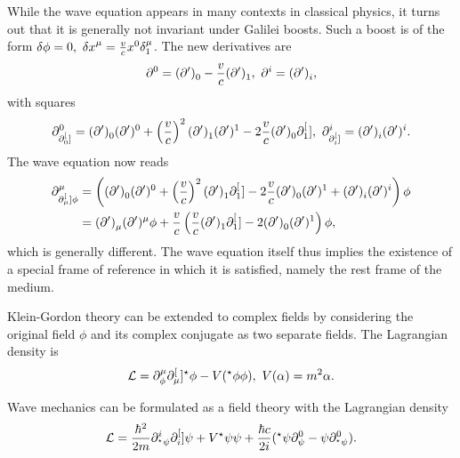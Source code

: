 While the wave equation appears in many contexts in classical physics, it turns out that it is generally not invariant under Galilei boosts. Such a boost is of the form $\var{\phi} = 0,\ \var{x}^{\mu} = \frac{v}{c}x^{0}\delta_{1}^{\mu}$. The new derivatives are
\begin{align*}
	\del{0}{} = \delp{0}{} - \frac{v}{c}\delp{1}{},\ \del{i}{} = \delp{i}{},
\end{align*}
with squares
\begin{align*}
	\del{0}{\del[0]{}{}} = \delp{0}{\delp[0]{}{}} + \left(\frac{v}{c}\right)^{2}\delp{1}{\delp[1]{}{}} - 2\frac{v}{c}\delp{0}{\del[1]{}{}},\ \del{i}{\del[i]{}{}} = \delp{i}{\delp[i]{}{}}.
\end{align*}
The wave equation now reads
\begin{align*}
	\del{\mu}{\del[\mu]{}{\phi}} &= \left(\delp{0}{\delp[0]{}{}} + \left(\frac{v}{c}\right)^{2}\delp{1}{\del[1]{}{}} - 2\frac{v}{c}\delp{0}{\delp[1]{}{}} + \delp{i}{\delp[i]{}{}}\right)\phi \\
	                             &= \delp{\mu}{\delp[\mu]{}{\phi}} + \frac{v}{c}\left(\frac{v}{c}\delp{1}{\del[1]{}{}} - 2\delp{0}{\delp[1]{}{}}\right)\phi,
\end{align*}
which is generally different. The wave equation itself thus implies the existence of a special frame of reference in which it is satisfied, namely the rest frame of the medium.

Klein-Gordon theory can be extended to complex fields by considering the original field $\phi$ and its complex conjugate as two separate fields. The Lagrangian density is
\begin{align*}
	\lag = \del{\mu}{\phi}\del[\mu]{}{\cc{\phi}} - V(\cc{\phi}\phi),\ V(\alpha) = m^{2}\alpha.
\end{align*}

Wave mechanics can be formulated as a field theory with the Lagrangian density
\begin{align*}
	\lag = \frac{\hbar^{2}}{2m}\del{i}{\cc{\psi}}\del[i]{}{\psi} + V\cc{\psi}\psi + \frac{\hbar c}{2i}(\cc{\psi}\del{0}{\psi} - \psi\del{0}{\cc{\psi}}).
\end{align*}

